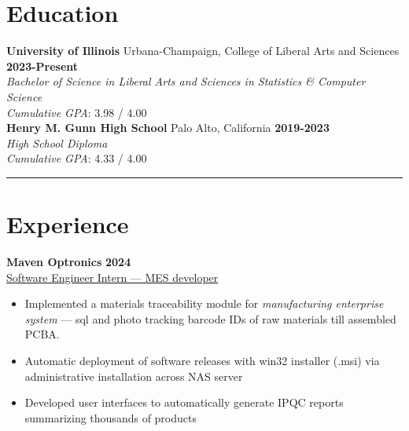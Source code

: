 \documentclass[11pt]{article}
\begin{document}


\section*{Education}
\vspace*{-1mm}

\textbf{University of Illinois} Urbana-Champaign, College of Liberal Arts and Sciences \hfill \textbf{2023-Present} \\
\emph{Bachelor of Science in Liberal Arts and Sciences in Statistics \& Computer Science} \\
\emph{Cumulative GPA}: 3.98 / 4.00 \\
\textbf{Henry M. Gunn High School} Palo Alto, California \hfill \textbf{2019-2023} \\
\emph{High School Diploma} \\
\emph{Cumulative GPA}: 4.33 / 4.00 \\

\vspace*{-5mm}
\rule{\textwidth}{0.1pt}
\vspace*{-10mm}

\section*{Experience}
\vspace*{-1mm}

\textbf{Maven Optronics} \hfill \textbf{2024} \\
\underline{Software Engineer Intern --- MES developer}
\begin{itemize}
	\cramped
    \item Implemented a materials traceability module for \emph{manufacturing enterprise system} --- sql and photo tracking barcode IDs of raw materials till assembled PCBA.
    \item Automatic deployment of software releases with win32 installer (.msi) via administrative installation across NAS server
    \item Developed user interfaces to automatically generate IPQC reports summarizing thousands of products

\end{itemize}
\end{document}
